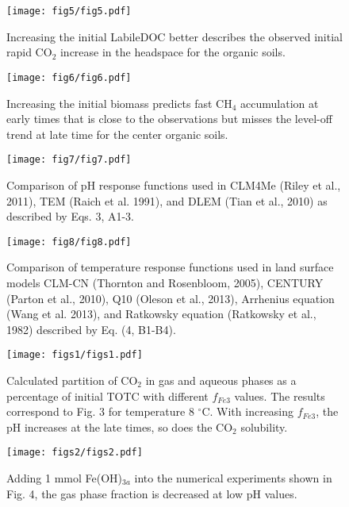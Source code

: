 \documentclass[12pt, a4paper]{article}
\begin{document}
\begin{figure}
\centering
\texttt{[image: fig5/fig5.pdf]}
\caption{
Increasing the initial LabileDOC better describes the observed initial rapid CO$_2$
increase in the headspace for the organic soils. 
}
\label{fig5}
\end{figure}

\begin{figure}
\centering
\texttt{[image: fig6/fig6.pdf]}
\caption{
Increasing the initial biomass predicts fast CH$_4$ accumulation at early times
that is close to the observations but misses the level-off trend at late time
for the center organic soils.
}
\label{fig6}
\end{figure}

\begin{figure}
\centering
\texttt{[image: fig7/fig7.pdf]}
\caption{
Comparison of pH response functions used in CLM4Me (Riley et al., 2011), TEM
(Raich et al. 1991), and DLEM (Tian et al., 2010) as described
by Eqs. 3, A1-3.
}
\label{fig7}
\end{figure}

\begin{figure}
\centering
\texttt{[image: fig8/fig8.pdf]}
\caption{
Comparison of temperature response functions used in land surface models CLM-CN
(Thornton and Rosenbloom, 2005), CENTURY (Parton et al., 2010), Q10 (Oleson et
al., 2013), Arrhenius equation (Wang et al. 2013), and Ratkowsky equation  (Ratkowsky et al.,
1982) described by Eq. (4, B1-B4). 
}
\label{fig8}
\end{figure}

\begin{figure}
\centering
\texttt{[image: figs1/figs1.pdf]}
\caption{
Calculated partition of CO$_2$ in gas and aqueous phases as a percentage of
initial TOTC with different $f_{Fe3}$ values. The results correspond to Fig. 3 for
temperature 8 $^{\circ}$C.  With increasing $f_{Fe3}$, the pH increases at the late times, so
does the CO$_2$ solubility.  
}
\label{figs1}
\end{figure}

\begin{figure}
\centering
\texttt{[image: figs2/figs2.pdf]}
\caption{
Adding 1 mmol Fe(OH)$_{3a}$ into the numerical experiments shown in Fig. 4, the gas
phase fraction is decreased at low pH values.
}
\label{figs2}
\end{figure}
\end{document}
